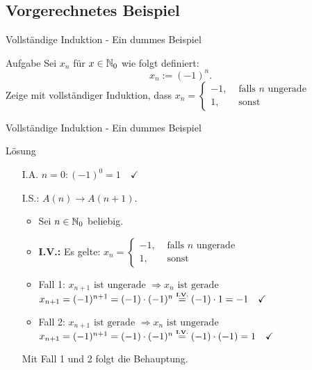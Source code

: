 \subsection{Vorgerechnetes Beispiel}
\begin{frame}{Vollständige Induktion - Ein dummes Beispiel}
	\begin{exampleblock}{Aufgabe}
		Sei $x_n$ für $x \in \mathbb{N}_0$ wie folgt definiert:
		\[
			x_n := (-1)^n.
		\]
		Zeige mit vollständiger Induktion, dass 
		$x_n = 
		\begin{cases}
			-1, &\text{ falls $n$ ungerade}\\
			1, &\text{ sonst}
		\end{cases}$
	\end{exampleblock}
\end{frame}
\begin{frame}{Vollständige Induktion - Ein dummes Beispiel}
	\begin{block}{Lösung}
		\begin{itemize}
			\item[I.A.] $n=0: (-1)^0=1 \quad \checkmark$
			\item[I.S.:] $A(n) \rightarrow A(n+1)$.\\
			\begin{itemize}
				\item Sei $n \in \mathbb{N}_{0}$ beliebig.
				\item \textbf{I.V.:} Es gelte: 
				 			$x_n = 
					\begin{cases}
						-1, &\text{ falls $n$ ungerade}\\
						1, &\text{ sonst}
					\end{cases}$\\[1.5em]
				\item Fall 1: $x_{n+1} \text{ ist ungerade } \Rightarrow x_n \text{ ist gerade}$\\
					$x_{n+1} = (-1)^{n+1} = (-1) \cdot (-1)^n \eqtext{\textbf{I.V.}} (-1) \cdot 1 = -1 \quad \checkmark$
				\item Fall 2: $x_{n+1} \text{ ist gerade } \Rightarrow x_n \text{ ist ungerade}$\\
					$x_{n+1} = (-1)^{n+1} = (-1) \cdot (-1)^n \eqtext{\textbf{I.V.}} (-1) \cdot (-1) = 1 \quad \checkmark$
			\end{itemize}
			Mit Fall 1 und 2 folgt die Behauptung. \qedwhite{}
		\end{itemize}
	\end{block}
\end{frame}